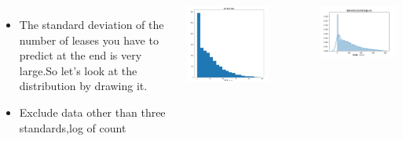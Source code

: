 \documentclass{tikzposter} %
\begin{document}
\begin{columns}
{  
    \begin{itemize}   
        \item
        The standard deviation of the number of leases you have to predict at the end is very large.So let's look at the distribution by drawing it.                         
        \item
        Exclude data other than three standards,log of count
    \end{itemize}
    \begin{minipage}{0.3\linewidth}
        \centering
        \includegraphics[width=0.7\textwidth]{pic1/count.png} 
    \end{minipage}
    \begin{minipage}{0.33\linewidth}
        \centering
        \includegraphics[width=1\textwidth]{pic1/count2.png} 
    \end{minipage}
    \begin{minipage}{0.33\linewidth}

\end{minipage}}
\end{columns}
\end{document}
